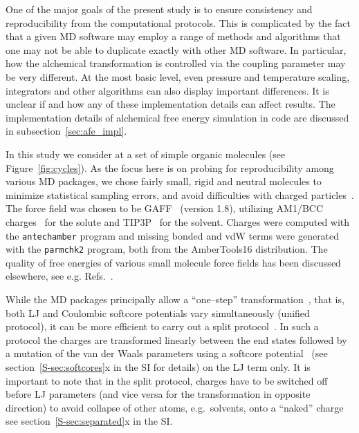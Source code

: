 \documentclass[journal=jctcce,manuscript=article]{achemso}
\newcommand{\progname}[1]{\texttt{#1}}
\begin{document}
One of the major goals of the present study is to ensure
consistency and reproducibility from the computational protocols.  This is complicated by the fact
that a given MD software may employ a range of methods and algorithms that one may not be
able to duplicate exactly with other MD software.
In particular, how the alchemical transformation is controlled via the coupling parameter may be very different.
At the most basic level, even pressure and temperature scaling, integrators and other algorithms can also display important differences.
It is unclear if and how any of these implementation details can affect results.
The implementation details of alchemical free energy simulation in code are discussed in subsection~\ref{sec:afe_impl}.

In this study we consider at a set of simple organic molecules (see
Figure~\ref{fig:cycles}).  As the focus here is on probing for
reproducibility among various MD packages, we chose fairly small,
rigid and neutral molecules to minimize statistical sampling errors, and
avoid difficulties with charged
particles~\cite{rocklin_calculating_2013, JCC:JCC1050}.  The force
field was chosen to be GAFF~\cite{wang_development_2004} (version
1.8), utilizing AM1/BCC charges~\cite{jakalian_fast_2000,
  jakalian_fast_2002} for the solute and
TIP3P~\cite{jorgensen_comparison_1983-1} for the solvent.
Charges were
computed with the \progname{antechamber} program and missing bonded and vdW
terms were generated with the \progname{parmchk2} program, both from the
AmberTools16 distribution.  The quality of free energies of various small
molecule force fields has been discussed
elsewhere, see e.g. Refs.~.

While the MD packages principally allow a ``one--step''
transformation~\cite{steinbrecher_soft-core_2011},
that is, both LJ and Coulombic softcore potentials vary
simultaneously (unified protocol), it can be more efficient to carry out a
split protocol~\cite{Deng-2004, naden_linear_2014, naden_linear_2015}.
In such a protocol the charges are transformed
linearly between the end states followed by a mutation of the van der
Waals parameters using a softcore
potential~\cite{beutler_avoiding_1994,
  zacharias_separationshifted_1994} (see section~\ref{S-sec:softcores}x in the
SI for details) on the LJ term only.  It is important to note that in the split protocol, charges have to be switched off before LJ parameters (and vice versa
for the transformation in opposite direction) to avoid collapse of
other atoms, e.g.\ solvents, onto a ``naked''
charge\cite{pitera_comparison_2002, anwar_robust_2005,
steinbrecher_soft-core_2011} see section~\ref{S-sec:separated}x in the SI.
\end{document}
